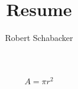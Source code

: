 \documentclass{article}
\title{Resume}
\author{Robert Schabacker}
\begin{document}
\maketitle
$$A=\pi r^{2}$$
\end{document}
